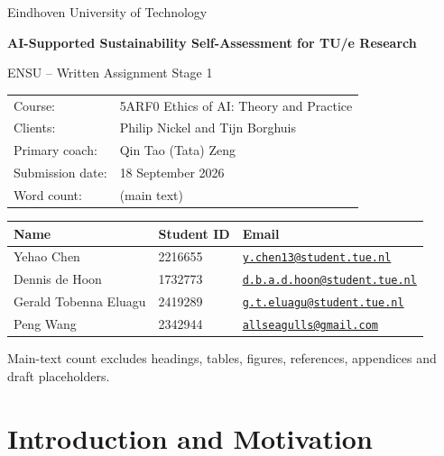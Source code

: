 \documentclass[11pt,a4paper]{article}
\begin{document}
\hypersetup{pageanchor=false}
\begin{titlepage}
\centering
\vspace*{3cm}
{\Large Eindhoven University of Technology\par}
\vspace{1.5cm}
{\huge\bfseries AI-Supported Sustainability Self-Assessment for TU/e Research\par}
\vspace{0.6cm}
{\Large ENSU -- Written Assignment Stage 1\par}
\vfill
\begin{tabularx}{0.95\textwidth}{@{}lX@{}}
Course: & 5ARF0 Ethics of AI: Theory and Practice \\
Clients: & Philip Nickel and Tijn Borghuis \\
Primary coach: & Qin Tao (Tata) Zeng \\
Submission date: & 18 September 2026 \\
Word count: & \mainwordcount{} (main text)
\end{tabularx}

\vspace{1cm}
\begin{tabularx}{0.95\textwidth}{@{}p{}p{}X@{}}
\toprule
Name & Student ID & Email \\
\midrule
Yehao Chen & 2216655 & \href{mailto:y.chen13@student.tue.nl}{\nolinkurl{y.chen13@student.tue.nl}} \\
Dennis de Hoon & 1732773 & \href{mailto:d.b.a.d.hoon@student.tue.nl}{\nolinkurl{d.b.a.d.hoon@student.tue.nl}} \\
Gerald Tobenna Eluagu & 2419289 & \href{mailto:g.t.eluagu@student.tue.nl}{\nolinkurl{g.t.eluagu@student.tue.nl}} \\
Peng Wang & 2342944 & \href{mailto:allseagulls@gmail.com}{\nolinkurl{allseagulls@gmail.com}} \\
\bottomrule
\end{tabularx}

\vspace{0.6cm}
{\footnotesize Main-text count excludes headings, tables, figures, references, appendices and draft placeholders.\par}

\vfill
\end{titlepage}
\hypersetup{pageanchor=true}

\section{Introduction and Motivation}
\end{document}
